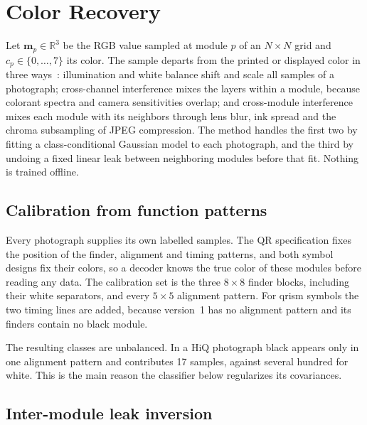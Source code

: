 \section{Color Recovery}
\label{sec:method}

Let $\mathbf{m}_p \in \mathbb{R}^3$ be the RGB value sampled at module $p$ of an
$N \times N$ grid and $c_p \in \{0,\dots,7\}$ its color. The sample departs from the
printed or displayed color in three ways~\cite{yang2018hiq}: illumination and white balance
shift and scale all samples of a photograph; cross-channel interference mixes the layers
within a module, because colorant spectra and camera sensitivities overlap; and
cross-module interference mixes each module with its neighbors through lens blur, ink
spread and the chroma subsampling of JPEG compression. The method handles the first two by
fitting a class-conditional Gaussian model to each photograph, and the third by undoing a
fixed linear leak between neighboring modules before that fit. Nothing is trained offline.

\subsection{Calibration from function patterns}
\label{sec:calibration}

Every photograph supplies its own labelled samples. The QR specification fixes the
position of the finder, alignment and timing patterns, and both symbol designs fix their
colors, so a decoder knows the true color of these modules before reading any data. The
calibration set is the three $8\times 8$ finder blocks, including their white separators,
and every $5\times 5$ alignment pattern. For qrism symbols the two timing lines are added,
because version~1 has no alignment pattern and its finders contain no black module.

The resulting classes are unbalanced. In a HiQ photograph black appears only in one
alignment pattern and contributes 17 samples, against several hundred for white. This is
the main reason the classifier below regularizes its covariances.

\subsection{Inter-module leak inversion}

